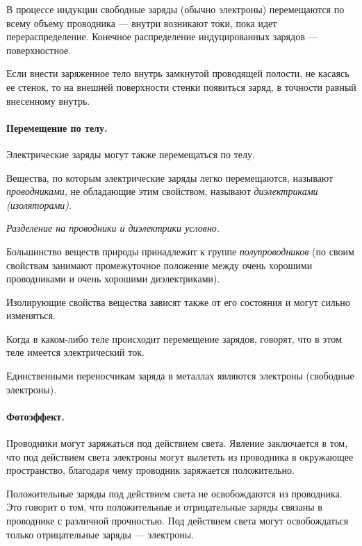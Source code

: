 \documentclass[a4paper,12pt]{article}
\begin{document}
		В процессе индукции свободные заряды (обычно электроны) перемещаются по всему 
		объему проводника — внутри возникают токи, пока идет перераспределение. 
		Конечное распределение индуцированных зарядов — поверхностное.

		Если внести заряженное тело внутрь замкнутой проводящей полости, не касаясь
		ее стенок, то на внешней поверхности стенки появиться заряд, в точности
		равный внесенному внутрь.



		\paragraph{Перемещение по телу.}
		Электрические заряды могут также перемещаться по телу.

		Вещества, по которым электрические заряды легко перемещаются, называют
		\textit{проводниками}, не обладающие этим свойством, называют
		\textit{диэлектриками (изоляторами)}.

		\textit{Разделение на проводники и диэлектрики условно.}

		Большинство веществ природы принадлежит к группе \textit{полупроводников}
		(по своим свойствам занимают промежуточное положение между очень хорошими
		проводниками и очень хорошими диэлектриками).

		Изолирующие свойства вещества зависят также от его состояния и могут
		сильно изменяться.

		Когда в каком-либо теле происходит перемещение зарядов, говорят, что в
		этом теле имеется электрический ток.

		Единственными перенос­чикам заряда в металлах являются электроны (свободные
		электроны).


		\paragraph{Фотоэффект.} Проводники могут заряжаться под действием света. 
		Явление заключается в том, что под действием света электроны могут вылететь из 
		проводника в окружающее пространство, благодаря чему проводник заряжается 
		положительно.

		Положительные заряды под действием света не освобождаются из проводника. Это
		говорит о том, что положительные и отрицательные заряды связаны в проводнике 
		с различной прочностью. Под действием света могут освобождаться только 
		отрицательные заряды — электроны.

		\
\end{document}
